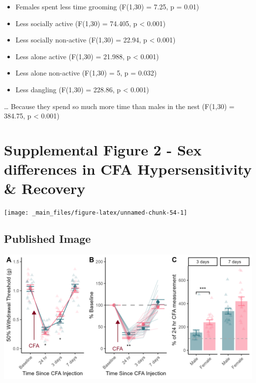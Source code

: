 \documentclass[
]{book}
\providecommand{\tightlist}{%
  \setlength{\itemsep}{0pt}\setlength{\parskip}{0pt}}
\begin{document}
\begin{itemize}
\tightlist
\item
  Females spent less time grooming (F(1,30) = 7.25, p = 0.01)
\item
  Less socially active (F(1,30) = 74.405, p \textless{} 0.001)
\item
  Less socially non-active (F(1,30) = 22.94, p \textless{} 0.001)
\item
  Less alone active (F(1,30) = 21.988, p \textless{} 0.001)
\item
  Less alone non-active (F(1,30) = 5, p = 0.032)
\item
  Less dangling (F(1,30) = 228.86, p \textless{} 0.001)
\end{itemize}

\ldots{} Because they spend so much more time than males in the nest (F(1,30) = 384.75, p \textless{} 0.001)

\hypertarget{supplemental-figure-2---sex-differences-in-cfa-hypersensitivity-recovery}{%
\chapter*{Supplemental Figure 2 - Sex differences in CFA Hypersensitivity \& Recovery}\label{supplemental-figure-2---sex-differences-in-cfa-hypersensitivity-recovery}}

\begin{center}\texttt{[image: \_main\_files/figure-latex/unnamed-chunk-54-1]} \end{center}

\hypertarget{published-image-6}{%
\section*{Published Image}\label{published-image-6}}

\begin{center}\includegraphics[width=29.17in]{Figs/S2_MvF_CFA} \end{center}
\end{document}
